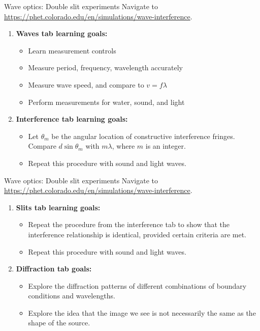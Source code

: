 \documentclass{beamer}
\begin{document}
\begin{frame}{Wave optics: Double slit experiments}
\small
Navigate to \url{https://phet.colorado.edu/en/simulations/wave-interference}.
\footnotesize
\begin{enumerate}
\item \textbf{Waves tab learning goals:}
\begin{itemize}
\item Learn measurement controls
\item Measure period, frequency, wavelength accurately
\item Measure wave speed, and compare to $v = f\lambda$
\item Perform measurements for water, sound, and light
\end{itemize}
\item \textbf{Interference tab learning goals:}
\begin{itemize}
\item Let $\theta_m$ be the angular location of constructive interference fringes.  Compare $d\sin\theta_m$ with $m\lambda$, where $m$ is an integer.
\item Repeat this procedure with sound and light waves.
\end{itemize}
\end{enumerate}
\end{frame}

\begin{frame}{Wave optics: Double slit experiments}
\small
Navigate to \url{https://phet.colorado.edu/en/simulations/wave-interference}.
\footnotesize
\begin{enumerate}
\item \textbf{Slits tab learning goals:}
\begin{itemize}
\item Repeat the procedure from the interference tab to show that the interference relationship is identical, provided certain criteria are met.
\item Repeat this procedure with sound and light waves.
\end{itemize}
\item \textbf{Diffraction tab goals:}
\begin{itemize}
\item Explore the diffraction patterns of different combinations of boundary conditions and wavelengths.
\item Explore the idea that the image we see is not necessarily the same as the shape of the source.
\end{itemize}
\end{enumerate}
\end{frame}
\end{document}
